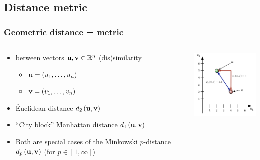\documentclass[t]{beamer} %
\begin{document}
\subsection{Distance metric}

\begin{frame}
  \frametitle{Geometric distance = metric}

  \begin{columns}[T]
    \begin{column}{60mm}
      \begin{itemize}
      \item {} between vectors $\vu, \vv \in \setR^n$ \so
        (dis)similarity
        \begin{itemize}
        \item $\vu = (u_1, \ldots, u_n)$
        \item $\vv = (v_1, \ldots, v_n)$
        \end{itemize}
      \item<2-> \h{Euclidean} distance $\dist[2]{\vu}{\vv}$
      \item<3-> ``City block'' \h{Manhattan} distance $\dist[1]{\vu}{\vv}$
      \item<4-> Both are special cases of the \h{Minkowski} $p$-distance
        $\dist[p]{\vu}{\vv}$ (for $p\in [1, \infty]$)
      \end{itemize}
    \end{column}
    \begin{column}{45mm}
      \includegraphics[width=45mm]{img/7_distance_examples}
    \end{column}
  \end{columns}
  \gap[.5]
\end{frame}
\end{document}

